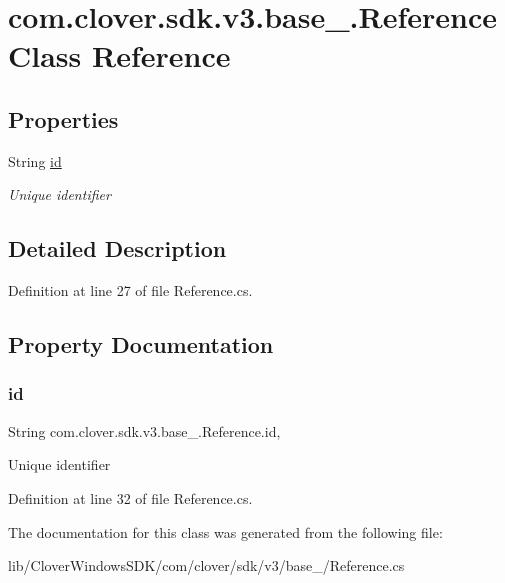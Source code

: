 \hypertarget{classcom_1_1clover_1_1sdk_1_1v3_1_1base___1_1_reference}{}\section{com.\+clover.\+sdk.\+v3.\+base\+\_\+.\+Reference Class Reference}
\label{classcom_1_1clover_1_1sdk_1_1v3_1_1base___1_1_reference}
\subsection*{Properties}
\begin{DoxyCompactItemize}
\item 
String \hyperlink{classcom_1_1clover_1_1sdk_1_1v3_1_1base___1_1_reference_a93d5319a2ba8b0c38fcfcd8b8be3d7a0}{id}
\begin{DoxyCompactList}\small\item\em Unique identifier \end{DoxyCompactList}\end{DoxyCompactItemize}


\subsection{Detailed Description}


Definition at line 27 of file Reference.\+cs.



\subsection{Property Documentation}
\mbox{\label{classcom_1_1clover_1_1sdk_1_1v3_1_1base___1_1_reference_a93d5319a2ba8b0c38fcfcd8b8be3d7a0}} 
\subsubsection{\texorpdfstring{id}{id}}
{\footnotesize\ttfamily String com.\+clover.\+sdk.\+v3.\+base\+\_\+.\+Reference.\+id\hspace{0.3cm}{\ttfamily [get]}, {\ttfamily [set]}}



Unique identifier 



Definition at line 32 of file Reference.\+cs.



The documentation for this class was generated from the following file\+:\begin{DoxyCompactItemize}
\item 
lib/\+Clover\+Windows\+S\+D\+K/com/clover/sdk/v3/base\+\_\+/Reference.\+cs\end{DoxyCompactItemize}
